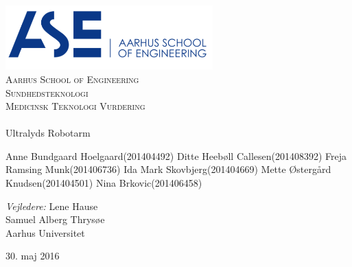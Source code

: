 \begin{titlingpage}
\begin{center}
~ \\[3cm]

\includegraphics[width=0.6\textwidth]{figurer/ASE}~\\[1cm]

\textsc{\LARGE Aarhus School of Engineering}\\[1.5cm]

\textsc{\Large Sundhedsteknologi}\\
\textsc{\Large Medicinsk Teknologi Vurdering }\\[0.5cm]

\noindent\makebox[\linewidth]{\rule{\textwidth}{0.4pt}}\\
[0.5cm]{\Huge Ultralyds Robotarm}
\noindent\makebox[\linewidth]{\rule{\textwidth}{0.4pt}}

\end{center}

Anne Bundgaard Hoelgaard\tab(201404492) \newline
Ditte Heebøll Callesen\tab(201408392) \newline
Freja Ramsing Munk\tab(201406736) \newline
Ida Mark Skovbjerg\tab(201404669) \newline	
Mette Østergård Knudsen\tab(201404501) \newline 
Nina Brkovic\tab(201406458) \newline 


\textit{Vejledere:} \newline
Lene Hause\\
Samuel Alberg Thrysøe\\
Aarhus Universitet

\vfill

\begin{center}
{\large 30. maj 2016}
\end{center}

\end{titlingpage}